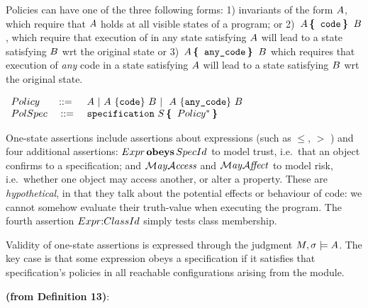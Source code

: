 Policies can have one of the three following forms:  
1) invariants of the form $A$, which   require that $A$ holds at all visible states of a 
program; or  
2)\  $A\, \mbox{\tt{\bf{\{ }}} \, {\textrm{\ttfamily{code}}}\, \mbox{\tt{\bf{\} }}}\, B$, which require that execution of  in any state satisfying $A$ will lead to a state
satisfying $B$ wrt the original state
 or  
 3)\ $A\, \mbox{\tt{\bf{\{ }}} \,  {{\textrm{\ttfamily{any\_code}}}}\, \mbox{\tt{\bf{\} }}} \, B$ which requires that execution of {\em any} 
 code in a state satisfying $A$ will lead to a state satisfying $B$ wrt the original state.


\setcounter{definition}{11}
\begin{definition}[Policies]
 $ ~ $ \\
 $
\begin{array}{lclcl}
Policy & \BBC & \ \A \ | \  \A \ \{ \prg{code} \}\  \B \ | \ \  \A \ \{ \prg{any\_code} \}\ \B
\\
PolSpec & \  \BBC  & \  \prg{specification}\ S \, \lb\, Policy^*\, \rb
\end{array}
$
\end{definition}


One-state assertions include assertions about  expressions (such as $\leq$, $>$ \etc) and four additional
assertions: ${{Expr}}\,\textbf{\textrm{obeys}}\,{SpecId}$ to model trust,
i.e.\ that an object confirms to a specification; and $\mathcal{M}\textrm{\textit{ay}}{\mathcal{A}}\textrm{\textit{ccess}}$ and
$\mathcal{M}\textrm{\textit{ay}}{\mathcal{A}}\textrm{\textit{ffect}}$ to model risk, i.e.\ whether one object may access
another, or alter a property.  These are {\em hypothetical}, in that
they talk about the potential effects or behaviour of code: we cannot
somehow evaluate their truth-value when executing the program.  The
fourth assertion ${{Expr}}{\bf {:}}{ClassId}$ 
simply tests class membership. 
 
 
Validity of one-state assertions is expressed through the judgment
$M,\sigma \models A$.  The key case is that some expression obeys a
specification if it satisfies that specification's policies in all
reachable configurations arising from the module.

 

\vspace*{1mm}\noindent\textbf{(from Definition 13)}:


